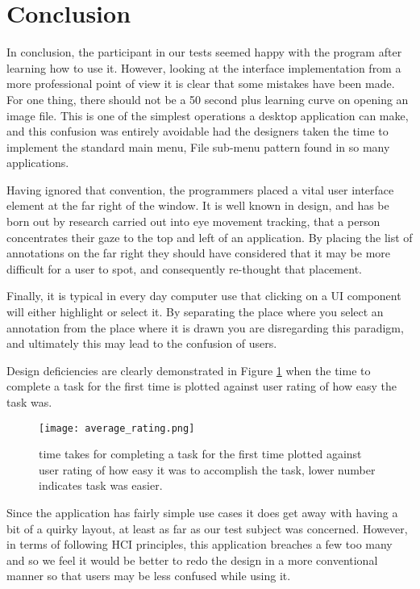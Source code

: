\section{Conclusion}

In conclusion, the participant in our tests seemed happy with the program after learning how to use it.  However, looking at the interface implementation from a more professional point of view it is clear that some mistakes have been made.  For one thing, there should not be a 50 second plus learning curve on opening an image file.  This is one of the simplest operations a desktop application can make, and this confusion was entirely avoidable had the designers taken the time to implement the standard main menu, File sub-menu pattern found in so many applications.

Having ignored that convention, the programmers placed a vital user interface element at the far right of the window. It is well known in design, and has be born out by research carried out into eye movement tracking, that a person concentrates their gaze to the top and left of an application.  By placing the list of annotations on the far right they should have considered that it may be more difficult for a user to spot, and consequently re-thought that placement.  

Finally, it is typical in every day computer use that clicking on a UI component will either highlight or select it.  By separating the place where you select an annotation from the place where it is drawn you are disregarding this paradigm, and ultimately this may lead to the confusion of users.

Design deficiencies are clearly demonstrated in Figure \ref{fig:ave_rate} when the time to complete a task for the first time is plotted against user rating of how easy the task was.

\begin{figure}[t]
\centering
\texttt{[image: average\_rating.png]}
\caption{time takes for completing a task for the first time plotted against user rating of how easy it was to accomplish the task, lower number indicates task was easier. }
\label{fig:ave_rate}
\end{figure}

Since the application has fairly simple use cases it does get away with having a bit of a quirky layout, at least as far as our test subject was concerned.  However, in terms of following HCI principles, this application breaches a few too many and so we feel it would be better to redo the design in a more conventional manner so that users may be less confused while using it.
